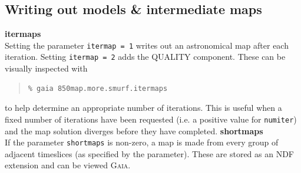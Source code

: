 \documentclass[twoside,11pt]{article}
\newcommand{\xref}[3]{#1}
\newcommand{\xlabel}[1]{}
\renewcommand{\_}{\texttt{\symbol{95}}}
\newenvironment{myquote}{
   \color{MidnightBlue}\begin{quote}\begin{small}}{
   \end{small}\end{quote}
}
\newcommand{\gaia}{\xref{\textsc{Gaia}}{sun214}{}}
\newcommand{\param}[1]{\texttt{#1}}
\renewenvironment{myquote}{
      \begin{quote}\begin{small}}{
      \end{small}\end{quote}
   }
\begin{document}
\subsection{\xlabel{inter}Writing out models \& intermediate maps}


\textbf{itermaps}\\
Setting the parameter \param{itermap~=~1} writes out an astronomical map after each
iteration. Setting \param{itermap~=~2} adds the QUALITY component.
These can be visually inspected with

\begin{myquote}
\begin{verbatim}
% gaia 850map.more.smurf.itermaps
\end{verbatim}
\end{myquote}
to help determine an appropriate number of iterations. This is useful
when a fixed number of iterations have been requested (i.e. a positive
value for \param{numiter}) and the map solution diverges before
they have completed.
\newline\newline
\textbf{shortmaps}\\
If the parameter \param{shortmaps} is non-zero, a map is made from
every group of adjacent timeslices (as specified by the parameter).
These are stored as an NDF extension and can be viewed \gaia.
\end{document}

